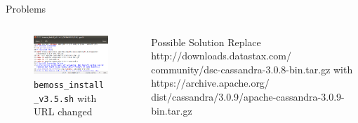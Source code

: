 \documentclass{beamer}
\begin{document}
\begin{frame}[fragile]{Problems}
	\begin{columns}[T]
		\begin{column}{0.5\textwidth}
			\begin{figure}
				\includegraphics[scale=0.25]{../figs/datastaxURLFix.png}
				\caption{\texttt{bemoss\_install\_v3.5.sh} with URL changed}
			\end{figure}
		\end{column}
		\begin{column}{0.5\textwidth}
			\begin{block}{Possible Solution}
					Replace http://downloads.datastax.com/
					community/dsc-cassandra-3.0.8-bin.tar.gz with https://archive.apache.org/
					dist/cassandra/3.0.9/apache-cassandra-3.0.9-bin.tar.gz
			\end{block}
		\end{column}
	\end{columns}
\end{frame}
\end{document}
